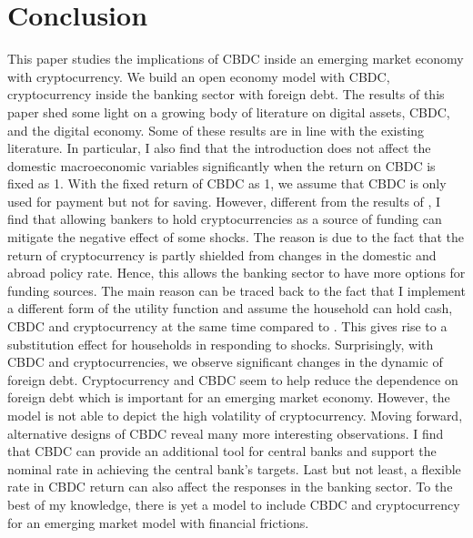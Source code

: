 \documentclass[12pt, a4paper]{article}
\begin{document}
\section{Conclusion}
This paper studies the implications of CBDC inside an emerging market economy with cryptocurrency. We build an open economy model with CBDC, cryptocurrency inside the banking sector with foreign debt. The results of this paper shed some light on a growing body of literature on digital assets, CBDC, and the digital economy. Some of these results are in line with the existing literature. In particular, I also find that the introduction does not affect the domestic macroeconomic variables significantly when the return on CBDC is fixed as 1. With the fixed return of CBDC as 1, we assume that CBDC is only used for payment but not for saving. However, different from the results of \cite{murakami2021cryptocurrencies}, I find that allowing bankers to hold cryptocurrencies as a source of funding can mitigate the negative effect of some shocks. The reason is due to the fact that the return of cryptocurrency is partly shielded from changes in the domestic and abroad policy rate. Hence, this allows the banking sector to have more options for funding sources. The main reason can be traced back to the fact that I implement a different form of the utility function and assume the household can hold cash, CBDC and cryptocurrency at the same time compared to \cite{murakami2021cryptocurrencies}. This gives rise to a substitution effect for households in responding to shocks. Surprisingly, with CBDC and cryptocurrencies, we observe significant changes in the dynamic of foreign debt. Cryptocurrency and CBDC seem to help reduce the dependence on foreign debt which is important for an emerging market economy. However, the model is not able to depict the high volatility of cryptocurrency. Moving forward, alternative designs of CBDC reveal many more interesting observations. I find that CBDC can provide an additional tool for central banks and support the nominal rate in achieving the central bank's targets. Last but not least, a flexible rate in CBDC return can also affect the responses in the banking sector. To the best of my knowledge, there is yet a model to include CBDC and cryptocurrency for an emerging market model with financial frictions.
\end{document}

